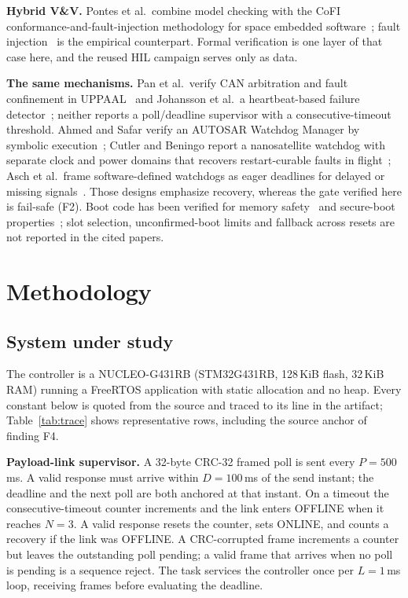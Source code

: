 \documentclass[conference,a4paper]{IEEEtran}
\begin{document}
\textbf{Hybrid V\&V.} Pontes et al.\ combine model checking with the CoFI conformance-and-fault-injection methodology for space embedded software~\cite{pontes2014}; fault injection~\cite{arlat1990,batista2019} is the empirical counterpart. Formal verification is one layer of that case here, and the reused HIL campaign serves only as data.

\textbf{The same mechanisms.} Pan et al.\ verify CAN arbitration and fault confinement in UPPAAL~\cite{pan2014} and Johansson et al.\ a heartbeat-based failure detector~\cite{johansson2020}; neither reports a poll/deadline supervisor with a consecutive-timeout threshold. Ahmed and Safar verify an AUTOSAR Watchdog Manager by symbolic execution~\cite{ahmed2018}; Cutler and Beningo report a nanosatellite watchdog with separate clock and power domains that recovers restart-curable faults in flight~\cite{cutler2022}; Asch et al.\ frame software-defined watchdogs as eager deadlines for delayed or missing signals~\cite{asch2025}. Those designs emphasize recovery, whereas the gate verified here is fail-safe (F2). Boot code has been verified for memory safety~\cite{cook2020} and secure-boot properties~\cite{vasudevan2024}; slot selection, unconfirmed-boot limits and fallback across resets are not reported in the cited papers.

\section{Methodology}
\label{sec:method}
\subsection{System under study}
\label{sec:system}
The controller is a NUCLEO-G431RB (STM32G431RB, 128\,KiB flash, 32\,KiB RAM) running a FreeRTOS application with static allocation and no heap. Every constant below is quoted from the source and traced to its line in the artifact; Table~\ref{tab:trace} shows representative rows, including the source anchor of finding F4.

\textbf{Payload-link supervisor.} A 32-byte CRC-32 framed poll is sent every $P=500$\,ms. A valid response must arrive within $D=100$\,ms of the send instant; the deadline and the next poll are both anchored at that instant. On a timeout the consecutive-timeout counter increments and the link enters OFFLINE when it reaches $N=3$. A valid response resets the counter, sets ONLINE, and counts a recovery if the link was OFFLINE. A CRC-corrupted frame increments a counter but leaves the outstanding poll pending; a valid frame that arrives when no poll is pending is a sequence reject. The task services the controller once per $L=1$\,ms loop, receiving frames before evaluating the deadline.
\end{document}
